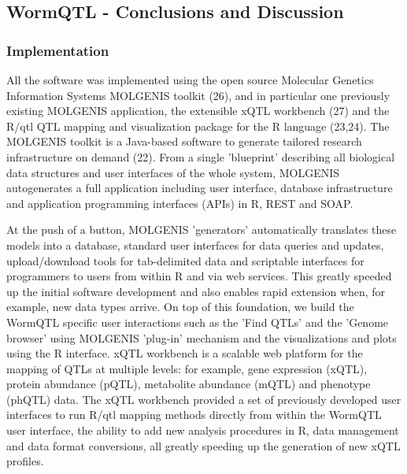 \documentclass[8pt, twoside, a5paper]{report}
\begin{document}
\subsection{WormQTL - Conclusions and Discussion}
\subsubsection{Implementation}
All the software was implemented using the open source Molecular Genetics Information Systems MOLGENIS toolkit (26), and in 
particular one previously existing MOLGENIS application, the extensible xQTL workbench (27) and the R/qtl QTL mapping and 
visualization package for the R language (23,24). The MOLGENIS toolkit is a Java-based software to generate tailored research 
infrastructure on demand (22). From a single 'blueprint' describing all biological data structures and user interfaces of the 
whole system, MOLGENIS autogenerates a full application including user interface, database infrastructure and application 
programming interfaces (APIs) in R, REST and SOAP.

At the push of a button, MOLGENIS 'generators' automatically translates these models into a database, standard user interfaces 
for data queries and updates, upload/download tools for tab-delimited data and scriptable interfaces for programmers to users 
from within R and via web services. This greatly speeded up the initial software development and also enables rapid extension 
when, for example, new data types arrive. On top of this foundation, we build the WormQTL specific user interactions such as 
the 'Find QTLs' and the 'Genome browser' using MOLGENIS 'plug-in' mechanism and the visualizations and plots using the R 
interface. xQTL workbench is a scalable web platform for the mapping of QTLs at multiple levels: for example, gene expression 
(xQTL), protein abundance (pQTL), metabolite abundance (mQTL) and phenotype (phQTL) data. The xQTL workbench provided a set of 
previously developed user interfaces to run R/qtl mapping methods directly from within the WormQTL user interface, the ability 
to add new analysis procedures in R, data management and data format conversions, all greatly speeding up the generation of 
new xQTL profiles.
\end{document}
